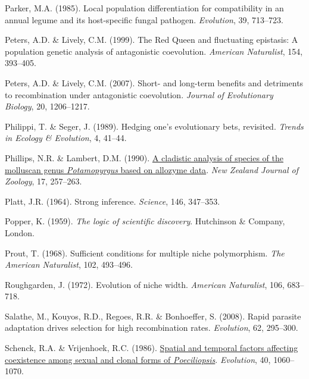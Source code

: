 \documentclass[
  letterpaper,
]{book}
\newlength{\cslhangindent}
\newenvironment{CSLReferences}[2] %
 {\begin{list}{}{%
  \setlength{\itemindent}{0pt}
  \setlength{\leftmargin}{0pt}
  \setlength{\parsep}{0pt}
  \ifodd #1
   \setlength{\leftmargin}{\cslhangindent}
   \setlength{\itemindent}{-1\cslhangindent}
  \fi
  \setlength{\itemsep}{#2\baselineskip}}}
 {\end{list}}
\begin{document}
\begin{CSLReferences}{1}{0}
Parker, M.A. (1985). Local population differentiation for compatibility
in an annual legume and its host-specific fungal pathogen.
\emph{Evolution}, 39, 713--723.

Peters, A.D. \& Lively, C.M. (1999). The {Red Queen} and fluctuating
epistasis: A population genetic analysis of antagonistic coevolution.
\emph{American Naturalist}, 154, 393--405.

Peters, A.D. \& Lively, C.M. (2007). Short- and long-term benefits and
detriments to recombination under antagonistic coevolution.
\emph{Journal of Evolutionary Biology}, 20, 1206--1217.

Philippi, T. \& Seger, J. (1989). Hedging one's evolutionary bets,
revisited. \emph{Trends in Ecology \& Evolution}, 4, 41--44.

Phillips, N.R. \& Lambert, D.M. (1990).
\href{https://doi.org/10.1080/03014223.1990.10422600}{A cladistic
analysis of species of the molluscan genus \emph{{P}otamopyrgus} based
on allozyme data}. \emph{New Zealand Journal of Zoology}, 17, 257--263.

Platt, J.R. (1964). Strong inference. \emph{Science}, 146, 347--353.

Popper, K. (1959). \emph{The logic of scientific discovery}. Hutchinson
\& Company, London.

Prout, T. (1968). Sufficient conditions for multiple niche polymorphism.
\emph{The American Naturalist}, 102, 493--496.

Roughgarden, J. (1972). Evolution of niche width. \emph{American
Naturalist}, 106, 683--718.

Salathe, M., Kouyos, R.D., Regoes, R.R. \& Bonhoeffer, S. (2008). Rapid
parasite adaptation drives selection for high recombination rates.
\emph{Evolution}, 62, 295--300.

Schenck, R.A. \& Vrijenhoek, R.C. (1986).
\href{https://doi.org/10.1111/j.1558-5646.1986.tb00573.x}{Spatial and
temporal factors affecting coexistence among sexual and clonal forms of
\emph{{P}oeciliopsis}}. \emph{Evolution}, 40, 1060--1070.


\end{CSLReferences}
\end{document}

